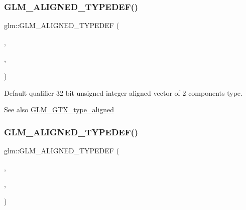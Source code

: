 \subsubsection{\texorpdfstring{G\+L\+M\+\_\+\+A\+L\+I\+G\+N\+E\+D\+\_\+\+T\+Y\+P\+E\+D\+E\+F()}{GLM\_ALIGNED\_TYPEDEF()}\hspace{0.1cm}{\footnotesize\ttfamily [130/209]}}
{\footnotesize\ttfamily glm\+::\+G\+L\+M\+\_\+\+A\+L\+I\+G\+N\+E\+D\+\_\+\+T\+Y\+P\+E\+D\+EF (\begin{DoxyParamCaption}\item[{\hyperlink{group__gtc__type__precision_gad854a1005ce84d8f6e8f05e42893f5c9}{u32vec2}}]{,  }\item[{aligned\+\_\+u32vec2}]{,  }\item[{8}]{ }\end{DoxyParamCaption})}

Default qualifier 32 bit unsigned integer aligned vector of 2 components type. \begin{DoxySeeAlso}{See also}
\hyperlink{group__gtx__type__aligned}{G\+L\+M\+\_\+\+G\+T\+X\+\_\+type\+\_\+aligned} 
\end{DoxySeeAlso}
\mbox{\label{group__gtx__type__aligned_ga0019500abbfa9c66eff61ca75eaaed94}} 
\subsubsection{\texorpdfstring{G\+L\+M\+\_\+\+A\+L\+I\+G\+N\+E\+D\+\_\+\+T\+Y\+P\+E\+D\+E\+F()}{GLM\_ALIGNED\_TYPEDEF()}\hspace{0.1cm}{\footnotesize\ttfamily [131/209]}}
{\footnotesize\ttfamily glm\+::\+G\+L\+M\+\_\+\+A\+L\+I\+G\+N\+E\+D\+\_\+\+T\+Y\+P\+E\+D\+EF (\begin{DoxyParamCaption}\item[{\hyperlink{group__gtc__type__precision_ga342e504c37b635393e6747b85147151f}{u32vec3}}]{,  }\item[{aligned\+\_\+u32vec3}]{,  }\item[{16}]{ }\end{DoxyParamCaption})}

